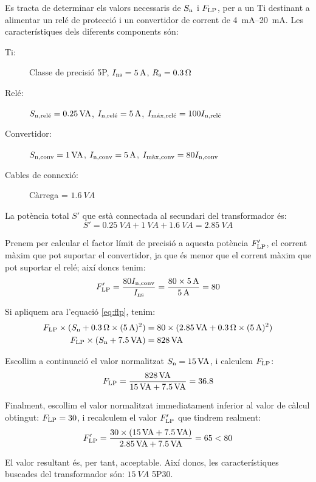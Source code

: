 	
\begin{exemple}[\CaractTrafoCorrent{}]
	\addcontentsxms{\CaractTrafoCorrent}
    Es tracta de determinar els valors necessaris de $S_\mathrm{n}$ i $F_\mathrm{LP}$,  per
    a un Ti destinant a alimentar  un relé de protecció i un convertidor
    de corrent de \qtyrange{4}{20}{mA}. Les característiques
    dels diferents components són:
    \begin{description}
        \item [\hspace{5mm}Ti:] Classe de precisió  5P, $I_\mathrm{ns}=\qty{5}{A}$,
        $R_\mathrm{s}=\qty{0,3}{\ohm}$
        \item [\hspace{5mm}Relé:] $S_\mathrm{n,rel\acute{e}}=\qty{0,25}{VA}$,
        $I_\mathrm{n,rel\acute{e}}=\qty{5}{A}$, $I_\mathrm{m\acute{a}x,rel\acute{e}}=
        100 I_\mathrm{n,rel\acute{e}}$
        \item [\hspace{5mm}Convertidor:] $S_\mathrm{n,conv}=\qty{1}{VA}$,
        $I_\mathrm{n,conv}=\qty{5}{A}$, $I_\mathrm{m\grave{a}x,conv}=
        80 I_\mathrm{n,conv}$
        \item [\hspace{5mm}Cables de connexió:] Càrrega = $\qty{1,6}{VA}$
    \end{description}

    La potència total $S'$ que està connectada al secundari del transformador
    és:
    \[
        S' = \qty{0,25}{VA} + \qty{1}{VA} + \qty{1,6}{VA} = \qty{2,85}{VA}
    \]

    Prenem per calcular el factor límit de precisió  a aquesta potència $F'_\mathrm{LP}$, el
    corrent màxim que pot suportar el convertidor, ja que és menor que el corrent màxim que pot suportar el relé; així doncs tenim:
    \[
        F'_\mathrm{LP} = \frac{80 I_\mathrm{n,conv}}{I_\mathrm{ns}} =
        \frac{80\times \qty{5}{A}}{\qty{5}{A}} = 80
    \]

    Si apliquem ara l'equació \eqref{eq:flp}, tenim:
    \begin{align*}
        F_\mathrm{LP}\times(S_\mathrm{n}+\qty{0,3}{\ohm} \times (\qty{5}{A})^2) &=
        80\times(\qty{2,85}{VA}+\qty{0,3}{\ohm} \times (\qty{5}{A})^2) \\
        F_\mathrm{LP}\times(S_\mathrm{n}+\qty{7,5}{VA}) &= \qty{828}{VA}
    \end{align*}

    Escollim a continuació el valor normalitzat $S_\mathrm{n}=
    \qty{15}{VA}$, i calculem $F_\mathrm{LP}$:
    \[
        F_\mathrm{LP} = \frac{\qty{828}{VA}}{\qty{15}{VA}+\qty{7,5}{VA}}
        = \num{36,8}
    \]

    Finalment, escollim el valor normalitzat immediatament inferior al valor
    de càlcul obtingut: $F_\mathrm{LP} = 30$, i
    recalculem el valor $F'_\mathrm{LP}$ que tindrem realment:
    \[
    F'_\mathrm{LP} = \frac{30\times(\qty{15}{VA} + \qty{7,5}{VA})}
    {\qty{2,85}{VA} + \qty{7,5}{VA}} = 65 < 80
    \]

    El valor resultant és, per tant, acceptable. Així doncs, les
    característiques buscades del transformador són: $\qty{15}{VA}$ 5P30.
\end{exemple}


